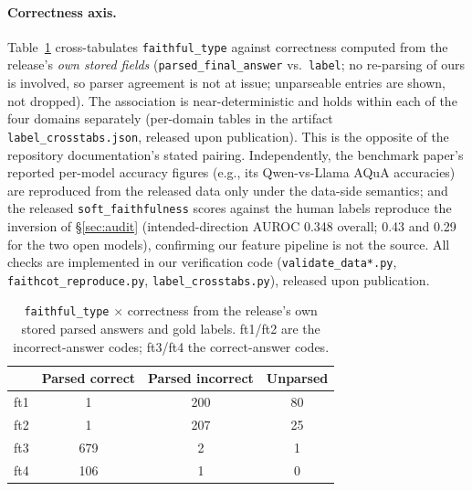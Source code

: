 \documentclass{article}
\begin{document}
\paragraph{Correctness axis.} Table~\ref{tab:crosstab} cross-tabulates \texttt{faithful\_type} against correctness computed from the release's \emph{own stored fields} (\texttt{parsed\_final\_answer} vs.\ \texttt{label}; no re-parsing of ours is involved, so parser agreement is not at issue; unparseable entries are shown, not dropped). The association is near-deterministic and holds within each of the four domains separately (per-domain tables in the artifact \texttt{label\_crosstabs.json}, released upon publication). This is the opposite of the repository documentation's stated pairing. Independently, the benchmark paper's reported per-model accuracy figures (e.g., its Qwen-vs-Llama AQuA accuracies) are reproduced from the released data only under the data-side semantics; and the released \texttt{soft\_faithfulness} scores against the human labels reproduce the inversion of \S\ref{sec:audit} (intended-direction AUROC 0.348 overall; 0.43 and 0.29 for the two open models), confirming our feature pipeline is not the source. All checks are implemented in our verification code (\texttt{validate\_data*.py}, \texttt{faithcot\_reproduce.py}, \texttt{label\_crosstabs.py}), released upon publication.

\begin{table}[h]
\centering
\small
\begin{tabular}{@{}lccc@{}}
\toprule
 & \textbf{Parsed correct} & \textbf{Parsed incorrect} & \textbf{Unparsed} \\
\midrule
ft1 & 1 & 200 & 80 \\
ft2 & 1 & 207 & 25 \\
ft3 & 679 & 2 & 1 \\
ft4 & 106 & 1 & 0 \\
\bottomrule
\end{tabular}
\caption{\texttt{faithful\_type} $\times$ correctness from the release's own stored parsed answers and gold labels. ft1/ft2 are the incorrect-answer codes; ft3/ft4 the correct-answer codes.}
\label{tab:crosstab}
\end{table}
\end{document}
